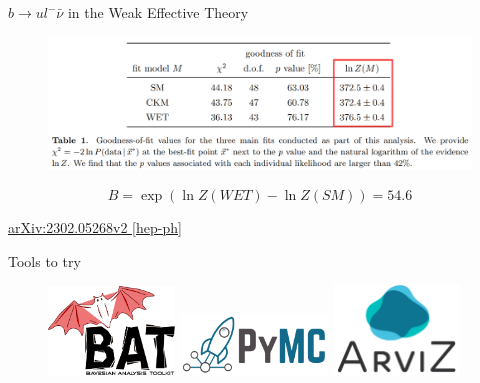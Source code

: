 \documentclass[
aspectratio=169,
14pt,
professionalfonts
]{beamer}
\begin{document}
\begin{frame}{$b\to u l^- \bar \nu$ in the Weak Effective Theory}
    \begin{figure}
        \centering
        \includegraphics[width=\textwidth]{../plots/wet-bayes.png}
    \end{figure}
    $$
    B = \exp(\ln Z(WET) - \ln Z (SM)) = 54.6
    $$
    \begin{flushright}
        \href{https://arxiv.org/pdf/2302.05268}{arXiv:2302.05268v2 [hep-ph]}
    \end{flushright}
\end{frame}

\begin{frame}{Tools to try}
\begin{figure}
    \center
    \href{
        https://github.com/bat
    }{\includegraphics[width=0.3\textwidth]{../plots/bat.pdf}}
    \hfill
    \href{
        https://www.pymc.io/
    }{\includegraphics[width=0.35\textwidth]{../plots/pymc.png}}
    \hfill
    \href{
        https://python.arviz.org/en/stable/
    }{\includegraphics[width=0.3\textwidth]{../plots/arviz.png}}
\end{figure}
\end{frame}
\end{document}
